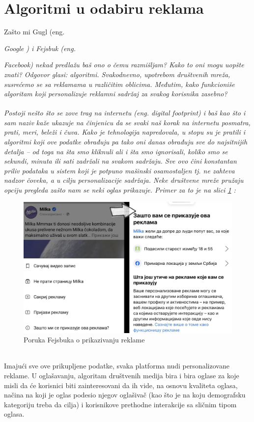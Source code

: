 \documentclass[a4paper]{article}
\begin{document}
	\section{Algoritmi u odabiru reklama}
	\label{sec:algoritmi}
	Zašto mi Gugl (eng.~{\em Google ) i Fejsbuk (eng.~{\em Facebook) nekad predlažu baš ono o čemu razmišljam? Kako to oni mogu uopšte znati? Odgovor glasi: algoritmi. Svakodnevno, upotrebom društvenih mreža, susrećemo se sa reklamama u različitim oblicima. Međutim, 		kako funkcioniše algoritam koji personalizuje reklamni sadržaj za svakog korisnika zasebno?\\ \\
			Postoji nešto što se zove trag na internetu (eng. digital footprint) i baš kao što i sam naziv kaže ukazuje na činjenicu da se svaki naš korak na internetu posmatra, prati, meri, beleži i čuva. Kako je tehnologija napredovala, u stopu su je pratili i algoritmi koji ove podatke 		obrađuju pa tako oni danas obrađuju sve do najsitnijih detalja – od toga na šta smo kliknuli ali i šta smo ignorisali, koliko smo se sekundi, minuta ili sati zadržali na svakom sadržaju. Sve ovo čini konstantan priliv podataka u sistem koji je potpuno mašinski osamostaljen tj. ne 		zahteva nadzor čoveka, a u cilju personalizacije sadržaja. Neke društvene mreže pružaju opciju pregleda zašto nam se neki oglas prikazuje. Primer za to je na slici \ref{fig:zastoreklama} : 
			\begin{figure}[h!]
				\begin{center}
					\includegraphics[scale=0.1]{zastoreklama.jpg}
				\end{center}
				\caption{Poruka Fejsbuka o prikazivanju reklame}
				\label{fig:zastoreklama}
			\end{figure}\\
			Imajući sve ove prikupljene podatke, svaka platforma nudi personalizovane reklame.  U oglašavanju, algoritam društvenih medija bira i bira oglase za koje misli da će korisnici biti zainteresovani da ih vide, na osnovu kvaliteta oglasa, načina na koji je oglas podesio njegov 		oglašivač (kao što je na koju demografsku kategoriju treba da cilja) i korisnikove prethodne interakcije sa sličnim tipom oglasa.  \cite{algoritmi}
			
}}
\end{document}
